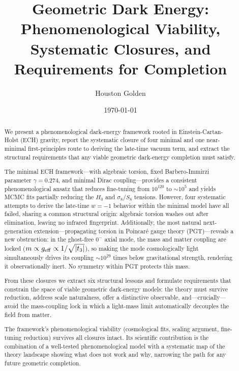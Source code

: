 \documentclass[aps,prd,twocolumn,superscriptaddress,showpacs,preprintnumbers,
  nofootinbib,longbibliography,floatfix]{revtex4-2}
\newcommand{\BI}{\gamma}
\begin{document}

\title{Geometric Dark Energy: Phenomenological Viability,\\
Systematic Closures, and Requirements for Completion}

\author{Houston Golden}

\date{\today}

\begin{abstract}
We present a phenomenological dark-energy framework rooted in
Einstein-Cartan-Holst (ECH) gravity, report the systematic closure of
four minimal and one near-minimal first-principles route to deriving the
late-time vacuum term, and extract the structural requirements that any
viable geometric dark-energy completion must satisfy.

The minimal ECH framework---with algebraic torsion, fixed Barbero-Immirzi
parameter $\BI = 0.274$, and minimal Dirac coupling---provides a
consistent phenomenological ansatz that reduces fine-tuning from
$10^{120}$ to $\sim\!10^5$ and yields MCMC fits partially reducing the
$H_0$ and $\sigma_8/S_8$ tensions. However, four systematic attempts to
derive the late-time $w = -1$ behavior within the minimal model have all
failed, sharing a common structural origin: algebraic torsion washes out
after elimination, leaving no infrared fingerprint. Additionally, the
most natural next-generation extension---propagating torsion in
Poincar\'e gauge theory (PGT)---reveals a new obstruction: in the
ghost-free $0^-$ axial mode, the mass and matter coupling are locked
($m \propto g_{\rm eff} \propto 1/\sqrt{|t_3|}$), so making the mode
cosmologically light simultaneously drives its coupling $\sim\!10^{29}$
times below gravitational strength, rendering it observationally inert.
No symmetry within PGT protects this mass.

From these closures we extract six structural lessons and formulate
requirements that constrain the space of viable geometric dark-energy
models: the theory must survive reduction, address scale naturalness,
offer a distinctive observable, and---crucially---avoid the
mass-coupling lock in which a light-mass limit automatically decouples
the field from matter.

The framework's phenomenological viability (cosmological fits, scaling
argument, fine-tuning reduction) survives all closures intact. Its
scientific contribution is the combination of a well-tested
phenomenological model with a systematic map of the theory landscape
showing what does not work and why, narrowing the path for any future
geometric completion.
\end{abstract}
\end{document}
